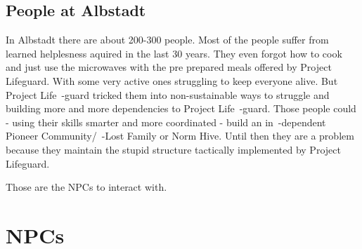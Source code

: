 \subsection{People at Albstadt}

In Albstadt there are about 200-300 people. Most of the people suffer from learned helplesness aquired in the last 30 years. They even forgot how to cook and just use the microwaves with the pre prepared meals offered by Project Lifeguard. With some very active ones struggling to keep everyone alive. But Project Life~-guard tricked them into non-sustainable ways to struggle and building more and more dependencies to Project Life~-guard. Those people could - using their skills smarter and more coordinated - build an in~-dependent Pioneer Community/~-Lost Family or Norm Hive. Until then they are a problem because they maintain the stupid structure tactically implemented by Project Lifeguard.

Those are the NPCs to interact with.

\section{NPCs}


